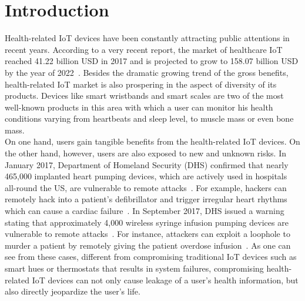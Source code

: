 \section{Introduction}
\label{sec:introduction}
Health-related IoT devices have been constantly attracting public attentions in recent years. According to a very recent report, the market of healthcare IoT reached 41.22 billion USD in 2017 and is projected to grow to 158.07 billion USD by the year of 2022~\cite{healthiotmarket}. Besides the dramatic growing trend of the gross benefits, health-related IoT market is also prospering in the aspect of diversity of its products. Devices like smart wristbands and smart scales are two of the most well-known products in this area with which a user can monitor his health conditions varying from heartbeats and sleep level, to muscle mass or even bone mass.\\
\indent On one hand, users gain tangible benefits from the health-related IoT devices. On the other hand, however, users are also exposed to new and unknown risks. In January 2017, Department of Homeland Security (DHS) confirmed that nearly 465,000 implanted heart pumping devices, which are actively used in hospitals all-round the US, are vulnerable to remote attacks~\cite{heartpump}. For example, hackers can remotely hack into a patient's defibrillator and trigger irregular heart rhythms which can cause a cardiac failure~\cite{heartpump}. In September 2017, DHS issued a warning stating that approximately 4,000 wireless syringe infusion pumping devices are vulnerable to remote attacks~\cite{infusionhack}. For instance, attackers can exploit a loophole to murder a patient by remotely giving the patient overdose infusion~\cite{infusionhack}. As one can see from these cases, different from compromising traditional IoT devices such as smart hues or thermostats that results in system failures, compromising health-related IoT devices can not only cause leakage of a user's health information, but also directly jeopardize the user's life.\\
